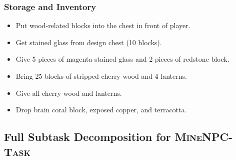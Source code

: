 \appxsmallsep
\subsubsection{Storage and Inventory}
\begin{itemize}
  \item Put wood-related blocks into the chest in front of player.
  \item Get stained glass from design chest (10 blocks).
  \item Give 5 pieces of magenta stained glass and 2 pieces of redstone block.
  \item Bring 25 blocks of stripped cherry wood and 4 lanterns.
  \item Give all cherry wood and lanterns.
  \item Drop brain coral block, exposed copper, and terracotta.
\end{itemize}

\FloatBarrier
\appxsep
\subsection{Full Subtask Decomposition for \textsc{MineNPC-Task}}

